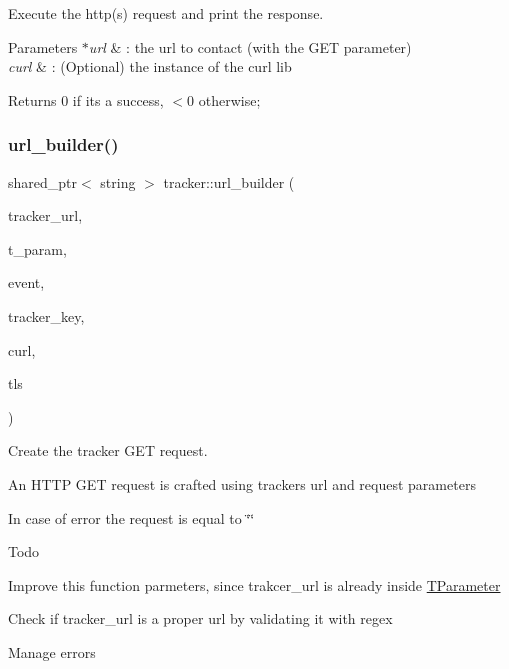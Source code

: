 Execute the http(s) request and print the response. 


\begin{DoxyParams}{Parameters}
{\em $\ast$url} & \+: the url to contact (with the G\+ET parameter) \\
\hline
{\em curl} & \+: (Optional) the instance of the curl lib\\
\hline
\end{DoxyParams}
\begin{DoxyReturn}{Returns}
0 if it\textquotesingle{}s a success, $<$0 otherwise; 
\end{DoxyReturn}
\mbox{\label{namespacetracker_a60c22f265981fba0a5dad14d6d3d516a}} 
\subsubsection{\texorpdfstring{url\+\_\+builder()}{url\_builder()}}
{\footnotesize\ttfamily shared\+\_\+ptr$<$ string $>$ tracker\+::url\+\_\+builder (\begin{DoxyParamCaption}\item[{const string \&}]{tracker\+\_\+url,  }\item[{const \hyperlink{structtracker_1_1TParameter}{T\+Parameter} \&}]{t\+\_\+param,  }\item[{event\+\_\+type}]{event,  }\item[{const string \&}]{tracker\+\_\+key,  }\item[{C\+U\+RL $\ast$}]{curl,  }\item[{bool}]{tls }\end{DoxyParamCaption})}



Create the tracker G\+ET request. 

An H\+T\+TP G\+ET request is crafted using tracker\textquotesingle{}s url and request parameters

In case of error the request is equal to \char`\"{}\char`\"{}

\begin{DoxyRefDesc}{Todo}
\item[\hyperlink{todo__todo000004}{Todo}]Improve this function parmeters, since trakcer\+\_\+url is already inside \hyperlink{structtracker_1_1TParameter}{T\+Parameter} 

Check if tracker\+\_\+url is a proper url by validating it with regex 

Manage errors\end{DoxyRefDesc}



